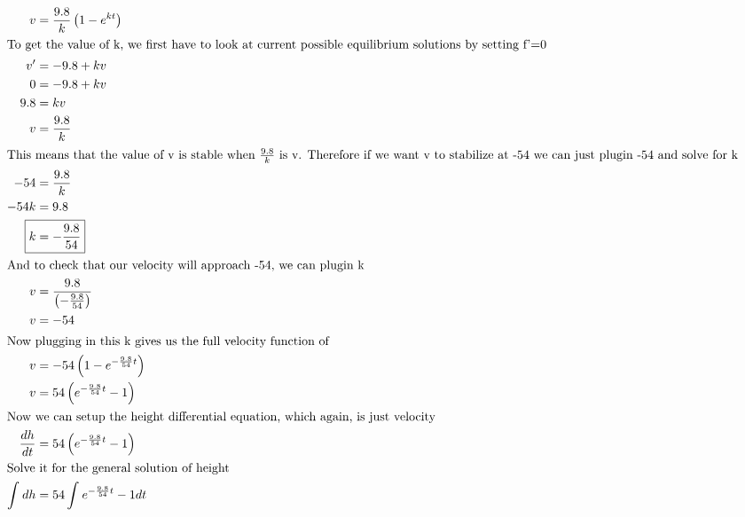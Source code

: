 \documentclass[12pt]{article}
\begin{document}
\begin{align}
  v                       & =\frac{9.8}{k}\left(1-e^{kt}\right)                                            \\
  \intertext{To get the value of k, we first have to look at current possible equilibrium solutions by setting f'=0}
  v'                      & =-9.8+kv                                                                       \\
  0                       & =-9.8+kv                                                                       \\
  9.8                     & =kv                                                                            \\
  v                       & =\frac{9.8}{k}                                                                 \\
  \intertext{This means that the value of v is stable when $\frac{9.8}{k}$ is v. Therefore if we want v to stabilize at -54 we can just plugin -54 and solve for k}
  -54                     & =\frac{9.8}{k}                                                                 \\
  -54k                    & =9.8                                                                           \\
  \Aboxed{k               & =-\frac{9.8}{54}}                                                              \\
  \intertext{And to check that our velocity will approach -54, we can plugin k}
  v                       & =\frac{9.8}{\left(-\frac{9.8}{54}\right)}                                      \\
  v                       & =-54                                                                           \\
  \intertext{Now plugging in this k gives us the full velocity function of}
  v                       & =-54\left(1-e^{-\frac{9.8}{54}t}\right)                                        \\
  v                       & =54\left(e^{-\frac{9.8}{54}t}-1\right)                                         \\
  \intertext{Now we can setup the height differential equation, which again, is just velocity}
  \frac{dh}{dt}           & =54\left(e^{-\frac{9.8}{54}t}-1\right)                                         \\
  \intertext{Solve it for the general solution of height}
  \int_{ }^{ }dh          & =54\int_{ }^{ }e^{-\frac{9.8}{54}t}-1dt                                        \\

\end{align}
\end{document}
